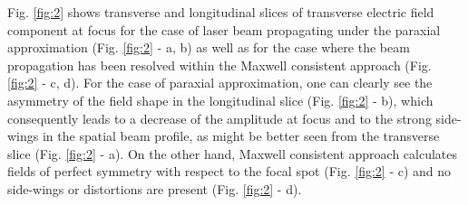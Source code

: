 Fig. \ref{fig:2} shows transverse and longitudinal slices of transverse electric field component at focus for the case of laser beam propagating under the paraxial approximation (Fig. \ref{fig:2} - a, b) as well as for the case where the beam propagation has been resolved within the Maxwell consistent approach (Fig. \ref{fig:2} - c, d). For the case of paraxial approximation, one can clearly see the asymmetry of the field shape in the longitudinal slice (Fig. \ref{fig:2} - b), which consequently leads to a decrease of the amplitude at focus and to the strong side-wings in the spatial beam profile, as might be better seen from the transverse slice (Fig. \ref{fig:2} - a). On the other hand, Maxwell consistent approach calculates fields of perfect symmetry with respect to the focal spot (Fig. \ref{fig:2} - c) and no side-wings or distortions are present (Fig. \ref{fig:2} - d).

